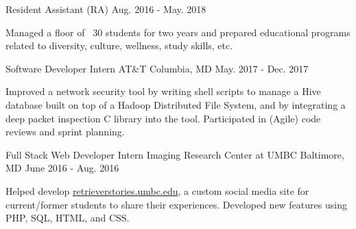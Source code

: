\begin{cventries}
  \cventry
    {Resident Assistant (RA)} %
    {} %
    {} %
    {Aug. 2016 - May. 2018} %
    {
      \begin{cvitems} %
        \item{Managed a floor of ~30 students for two years and prepared educational programs related to diversity, culture, wellness, study skills, etc.}
      \end{cvitems}
    }

  \cventry
    {Software Developer Intern} %
    {AT\&T} %
    {Columbia, MD} %
    {May. 2017 - Dec. 2017} %
    {
      \begin{cvitems} %
        \item {Improved a network security tool by writing shell scripts to manage a Hive database built on 
top of a Hadoop Distributed File System, and by integrating a deep packet inspection C 
library into the tool.  Participated in (Agile) code reviews and sprint planning.}
      \end{cvitems}
    }

  \cventry
    {Full Stack Web Developer Intern} %
    {Imaging Research Center at UMBC} %
    {Baltimore, MD} %
    {June 2016 - Aug. 2016} %
    {
      \begin{cvitems} %
        \item {Helped develop \href{https://retrieverstories.umbc.edu}{retrieverstories.umbc.edu}, a custom social media site for current/former students to share their experiences.  Developed new features using PHP, SQL, HTML, and CSS.}
      \end{cvitems}
    }


\end{cventries}
